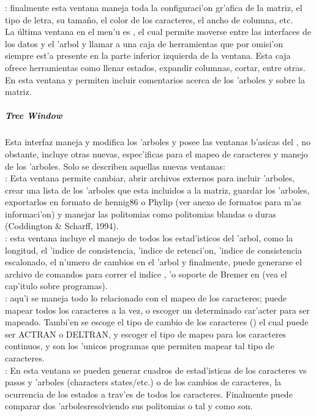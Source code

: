: finalmente esta ventana maneja toda la configuraci'on gr'afica de la matriz, el tipo de letra, su tama\~no, el color de los caracteres, el ancho de columna, etc.\\
La \'ultima ventana en el men'u es , el cual permite moverse entre las interfaces de los datos y el 'arbol y llamar a una caja de herramientas que por omisi'on siempre est'a presente en la parte inferior izquierda de la ventana. Esta caja ofrece herramientas como llenar estados, expandir columnas, cortar, entre otras. En esta ventana  y  permiten incluir comentarios acerca de los 'arboles y sobre la matriz.
\subparagraph*{Tree Window}
Esta interfaz maneja y modifica los 'arboles y posee las ventanas b'asicas del , no obstante, incluye otras nuevas, espec'ificas para el mapeo de caracteres y manejo de los 'arboles. Solo se describen aquellas nuevas ventanas: \\
: Esta ventana permite cambiar, abrir archivos externos para incluir 'arboles, crear una lista de los 'arboles que esta incluidos a la matriz, guardar los 'arboles, exportarlos en formato de hennig86 o Phylip (ver anexo de formatos para m'as informaci'on) y manejar las politomias como politomias blandas o duras (Coddington \& Scharff, 1994).\\
\Gui{$\Sigma$}: esta ventana incluye el manejo de todos los estad'isticos  del 'arbol, como la longitud, el 'indice de consistencia, 'indice de retenci'on, 'indice de consistencia escalonado, el n'umero de cambios en el 'arbol y finalmente, puede generarse el archivo de comandos para correr el indice , 'o soporte de Bremer en  (vea el cap'itulo sobre programas).\\
: aqu'i se maneja todo lo relacionado con el mapeo de los caracteres; puede mapear todos los caracteres a la vez, o escoger un determinado car'acter para ser mapeado. Tambi'en se escoge el tipo de cambio de los caracteres () el cual puede ser ACTRAN o DELTRAN, y escoger el tipo de mapeo para los caracteres continuos,  y  son los 'unicos programas que permiten mapear tal tipo de caracteres.\\
: En esta ventana se pueden generar cuadros de estad'isticas de los caracteres vs pasos y 'arboles (characters states/etc.) o de los cambios de caracteres, la ocurrencia de los estados  a trav'es de todos los caracteres. Finalmente puede comparar dos 'arbolesresolviendo sus politomias o tal y como son.\\

